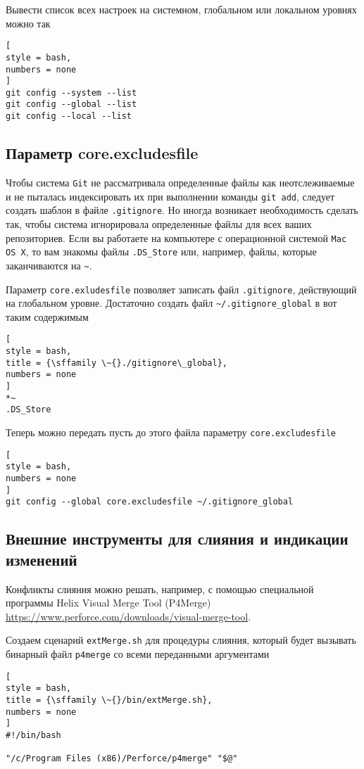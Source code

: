 \documentclass[%
	11pt,
	a4paper,
	utf8,
		]{article}
\begin{document}
Вывести список всех настроек на системном, глобальном или локальном уровнях можно так
\begin{lstlisting}[
style = bash,
numbers = none
]
git config --system --list
git config --global --list
git config --local --list
\end{lstlisting}

\subsection{Параметр core.excludesfile}

Чтобы система \texttt{Git} не рассматривала определенные файлы как неотслеживаемые и не пыталась индексировать их при выполнении команды \texttt{git add}, следует создать шаблон в файле \texttt{.gitignore}. Но иногда возникает необходимость сделать так, чтобы система игнорировала определенные файлы для всех ваших репозиториев. Если вы работаете на компьютере с операционной системой \texttt{Mac OS X}, то вам знакомы файлы \texttt{.DS\_Store} или, например, файлы, которые заканчиваются на \verb|~|.

Параметр \texttt{core.exludesfile} позволяет записать файл \texttt{.gitignore}, действующий на глобальном уровне. Достаточно создать файл \verb|~/.gitignore_global| в вот таким содержимым
\begin{lstlisting}[
style = bash,
title = {\sffamily \~{}./gitignore\_global},
numbers = none
]
*~
.DS_Store
\end{lstlisting}

Теперь можно передать пусть до этого файла параметру \texttt{core.excludesfile}
\begin{lstlisting}[
style = bash,
numbers = none
]
git config --global core.excludesfile ~/.gitignore_global
\end{lstlisting}

\subsection{Внешние инструменты для слияния и индикации изменений}

Конфликты слияния можно решать, например, с помощью специальной программы Helix Visual Merge Tool (P4Merge) \url{https://www.perforce.com/downloads/visual-merge-tool}.

Создаем сценарий \texttt{extMerge.sh} для процедуры слияния, который будет вызывать бинарный файл \texttt{p4merge} со всеми переданными аргументами
\begin{lstlisting}[
style = bash,
title = {\sffamily \~{}/bin/extMerge.sh},
numbers = none
]
#!/bin/bash

"/c/Program Files (x86)/Perforce/p4merge" "$@"
\end{lstlisting}
\end{document}
